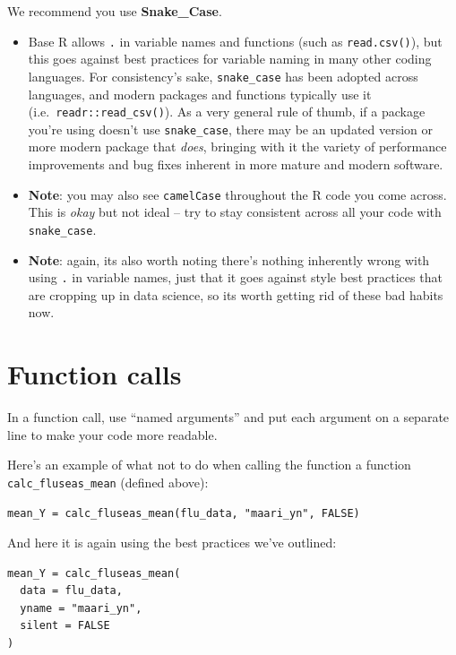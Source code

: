 \documentclass[
]{book}
\begin{document}
We recommend you use \textbf{Snake\_Case}.

\begin{itemize}
\item
  Base R allows \texttt{.} in variable names and functions (such as \texttt{read.csv()}), but this goes against best practices for variable naming in many other coding languages. For consistency's sake, \texttt{snake\_case} has been adopted across languages, and modern packages and functions typically use it (i.e.~\texttt{readr::read\_csv()}). As a very general rule of thumb, if a package you're using doesn't use \texttt{snake\_case}, there may be an updated version or more modern package that \emph{does}, bringing with it the variety of performance improvements and bug fixes inherent in more mature and modern software.
\item
  \textbf{Note}: you may also see \texttt{camelCase} throughout the R code you come across. This is \emph{okay} but not ideal -- try to stay consistent across all your code with \texttt{snake\_case}.
\item
  \textbf{Note}: again, its also worth noting there's nothing inherently wrong with using \texttt{.} in variable names, just that it goes against style best practices that are cropping up in data science, so its worth getting rid of these bad habits now.
\end{itemize}

\hypertarget{function-calls}{%
\section{Function calls}\label{function-calls}}

In a function call, use ``named arguments'' and put each argument on a separate line to make your code more readable.

Here's an example of what not to do when calling the function a function \texttt{calc\_fluseas\_mean} (defined above):

\begin{verbatim}
mean_Y = calc_fluseas_mean(flu_data, "maari_yn", FALSE)
\end{verbatim}

And here it is again using the best practices we've outlined:

\begin{verbatim}
mean_Y = calc_fluseas_mean(
  data = flu_data, 
  yname = "maari_yn",
  silent = FALSE
)
\end{verbatim}
\end{document}

